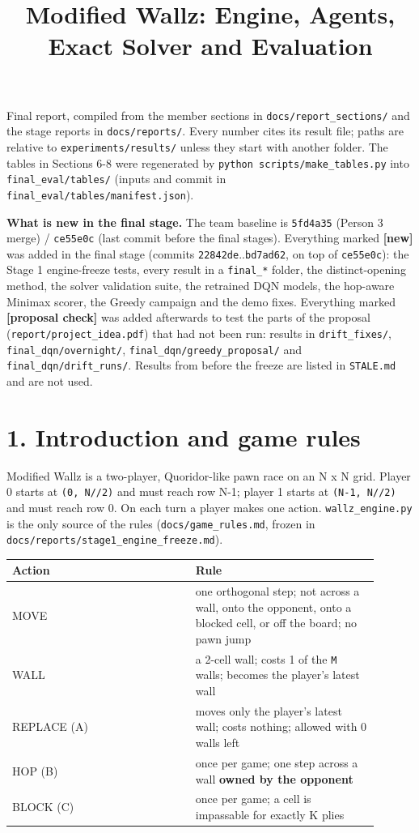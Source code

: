 \documentclass[11pt]{article}
\title{Modified Wallz: Engine, Agents, Exact Solver and Evaluation}
\date{}
\begin{document}
\maketitle

Final report, compiled from the member sections in \texttt{docs/report\_sections/} and the stage
reports in \texttt{docs/reports/}. Every number cites its result file; paths are relative to
\texttt{experiments/results/} unless they start with another folder. The tables in Sections 6-8 were
regenerated by \texttt{python scripts/make\_tables.py} into \texttt{final\_eval/tables/} (inputs and commit in
\texttt{final\_eval/tables/manifest.json}).

\textbf{What is new in the final stage.} The team baseline is \texttt{5fd4a35} (Person 3 merge) /
\texttt{ce55e0c} (last commit before the final stages). Everything marked \textbf{[new]} was added in
the final stage (commits \texttt{22842de}..\texttt{bd7ad62}, on top of \texttt{ce55e0c}): the Stage 1 engine-freeze tests, every result in a
\texttt{final\_*} folder, the distinct-opening method, the solver validation suite, the retrained DQN
models, the hop-aware Minimax scorer, the Greedy campaign and the demo fixes. Everything marked
\textbf{[proposal check]} was added afterwards to test the parts of the proposal
(\texttt{report/project\_idea.pdf}) that had not been run: results in \texttt{drift\_fixes/},
\texttt{final\_dqn/overnight/}, \texttt{final\_dqn/greedy\_proposal/} and \texttt{final\_dqn/drift\_runs/}. Results from
before the freeze are listed in \texttt{STALE.md} and are not used.

\section{1. Introduction and game rules}

Modified Wallz is a two-player, Quoridor-like pawn race on an N x N grid. Player 0 starts at
\texttt{(0, N//2)} and must reach row N-1; player 1 starts at \texttt{(N-1, N//2)} and must reach row 0.
On each turn a player makes one action. \texttt{wallz\_engine.py} is the only source of the rules
(\texttt{docs/game\_rules.md}, frozen in \texttt{docs/reports/stage1\_engine\_freeze.md}).

\begin{center}\scriptsize
\begin{longtable}{p{0.45\linewidth}p{0.45\linewidth}}
\toprule
Action & Rule \\
\midrule
MOVE & one orthogonal step; not across a wall, onto the opponent, onto a blocked cell, or off the board; no pawn jump \\
WALL & a 2-cell wall; costs 1 of the \texttt{M} walls; becomes the player's latest wall \\
REPLACE (A) & moves only the player's latest wall; costs nothing; allowed with 0 walls left \\
HOP (B) & once per game; one step across a wall \textbf{owned by the opponent} \\
BLOCK (C) & once per game; a cell is impassable for exactly K plies \\
\bottomrule
\end{longtable}
\end{center}
\end{document}
